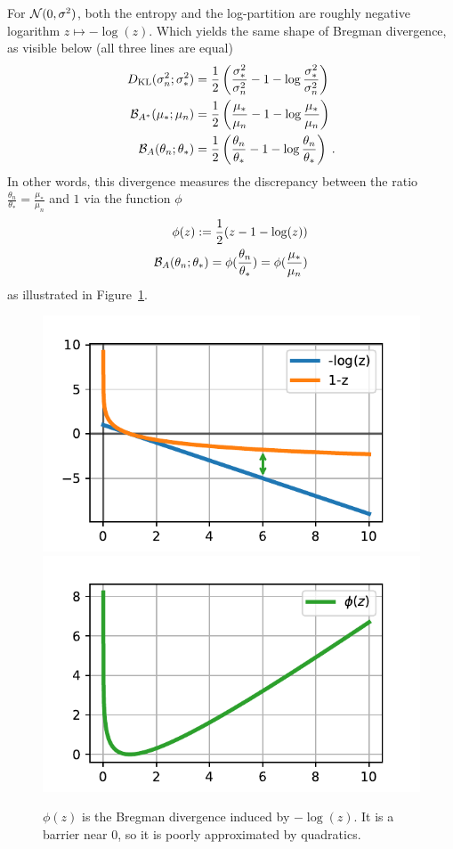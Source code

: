 \documentclass{article}
\newenvironment{example}{
	\begin{mdframed}[backgroundcolor=light-gray, roundcorner=5pt]
}{		
	\end{mdframed}
}
\newcommand{\logpart}{A}
\newcommand{\bregman}{\cB_\logpart}
\newcommand{\bregmanconj}{\cB_{\logpart^*}}
\newcommand{\natp}{\theta}
\begin{document}
\begin{example}
	For ${\mathcal N}(0,\sigma^2)$, both the entropy and the log-partition are roughly negative logarithm $z\mapsto - \log(z)$. Which yields the same shape of Bregman divergence, as visible below (all three lines are equal)
\begin{align}
	\KL( \sigma_n^2 ; \sigma_*^2) 
	&= \half \left ( \frac{\sigma_*^2}{ \sigma_n^2} - 1 - \log \frac{\sigma_*^2}{ \sigma_n^2} \right) \\
	\bregmanconj( \mu_*; \mu_n) 
	&= \half \left ( \frac{\mu_*}{ \mu_n} - 1 - \log  \frac{\mu_*}{ \mu_n} \right) \\
	\bregman( \natp_n; \natp_* ) 
	&=  \half \left ( \frac{ \natp_n}{\natp_*} - 1 - \log  \frac{ \natp_n}{\natp_*} \right) \; .
\end{align}
In other words, this divergence measures the discrepancy between the ratio $\frac{ \natp_n}{\natp_*} =  \frac{\mu_*}{ \mu_n}  $ and $1$ via the function $\phi$
\begin{align}
	\phi(z) := \half (z - 1 - \log(z)) \\
	\bregman( \natp_n; \natp_* )   = \phi(\frac{ \natp_n}{\natp_*}) =  \phi(\frac{\mu_*}{ \mu_n})
\end{align}
as illustrated in Figure~\ref{fig:phi}.
\end{example}

\begin{figure}[ht]
	\centering
	\includegraphics[width=.4\textwidth]{figs/bregmandef.pdf}
	\includegraphics[width=.4\textwidth]{figs/phi.pdf}
	\caption{$\phi(z)$ is the Bregman divergence induced by $-\log(z)$. It is a barrier near $0$, so it is poorly approximated by quadratics.}
	\label{fig:phi}
\end{figure}
\end{document}
